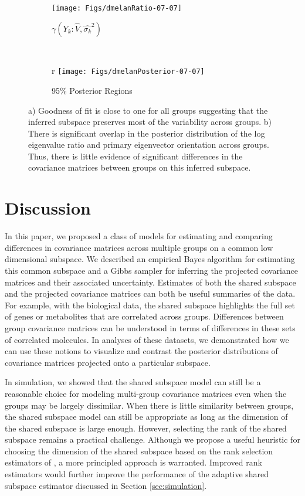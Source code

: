 \documentclass[12pt]{article}
\begin{document}
\begin{figure}[t]
    \centering
    \begin{subfigure}[b]{0.45\textwidth}
        \texttt{[image: Figs/dmelanRatio-07-07]}
        \caption{$\gamma(Y_k: \hat{V}, \hat{\sigma_k}^2)$}
        \label{fig:dmelanRatio}
      \end{subfigure}
    ~ %
    \begin{subfigure}[b]{0.45\textwidth}r
        \texttt{[image: Figs/dmelanPosterior-07-07]}
        \caption{95\% Posterior Regions}
        \label{fig:dmelanPosterior}
    \end{subfigure}
    \caption{a) Goodness of fit is close to one for all groups
      suggesting that the inferred subspace preserves most of the
      variability across groups. b) There is significant overlap in
      the posterior distribution of the log eigenvalue ratio and primary
      eigenvector orientation across groups. Thus, there is little
      evidence of significant differences in the covariance matrices
      between groups on this inferred subspace.  }
\end{figure}

\section{Discussion}

In this paper, we proposed a class of models for estimating and
comparing differences in covariance matrices across multiple groups on
a common low dimensional subspace.  We described an empirical Bayes
algorithm for estimating this common subspace and a Gibbs sampler for
inferring the projected covariance matrices and their associated
uncertainty.  Estimates of both the shared subspace and the projected
covariance matrices can both be useful summaries of the data.  For
example, with the biological data, the shared subspace highlights the
full set of genes or metabolites that are correlated across groups.
Differences between group covariance matrices can be understood in
terms of differences in these sets of correlated molecules.  In
analyses of these datasets, we demonstrated how
we can use these notions to visualize and contrast the posterior
distributions of covariance matrices projected onto a particular
subspace.

In simulation, we showed that the shared subspace model can still be a
reasonable choice for modeling multi-group covariance matrices even
when the groups may be largely dissimilar.  When there is little
similarity between groups, the shared subspace model can still be appropriate as
long as the dimension of the shared subspace is large enough.
However, selecting the rank of the shared subspace remains a practical
challenge.  Although we propose a useful heuristic for choosing the
dimension of the shared subspace based on the rank selection
estimators of \citet{Gavish2014}, a more principled approach is
warranted.  Improved rank estimators would further improve the
performance of the adaptive shared subspace estimator discussed in
Section \ref{sec:simulation}.
\end{document}
